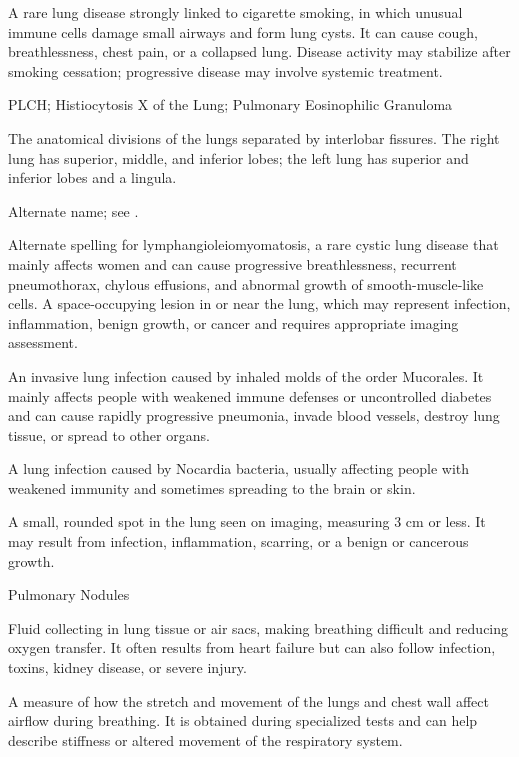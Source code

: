  A rare lung disease strongly linked to cigarette smoking, in which unusual immune cells damage small airways and form lung cysts. It can cause cough, breathlessness, chest pain, or a collapsed lung. Disease activity may stabilize after smoking cessation; progressive disease may involve systemic treatment.

\synonyms
PLCH; Histiocytosis X of the Lung; Pulmonary Eosinophilic Granuloma

 The anatomical divisions of the lungs separated by interlobar fissures. The right lung
has superior, middle, and inferior lobes; the left lung has superior and inferior lobes
and a lingula.

 Alternate name; see .

 Alternate spelling for lymphangioleiomyomatosis, a rare cystic lung disease that mainly affects women and can cause progressive breathlessness, recurrent pneumothorax, chylous effusions, and abnormal growth of smooth-muscle-like cells.
 A space-occupying lesion in or near the lung, which may represent infection, inflammation, benign growth, or cancer and requires appropriate imaging assessment.

 An invasive lung infection caused by inhaled molds of the order Mucorales. It mainly affects people with weakened immune defenses or uncontrolled diabetes and can cause rapidly progressive pneumonia, invade blood vessels, destroy lung tissue, or spread to other organs.

 A lung infection caused by Nocardia bacteria, usually affecting people with weakened immunity and sometimes spreading to the brain or skin.

 A small, rounded spot in the lung seen on imaging, measuring 3 cm or less. It may result from infection, inflammation, scarring, or a benign or cancerous growth.

\synonyms
Pulmonary Nodules

 Fluid collecting in lung tissue or air sacs, making breathing difficult and reducing oxygen transfer. It often results from heart failure but can also follow infection, toxins, kidney disease, or severe injury.

 A measure of how the stretch and movement of the lungs and chest wall affect airflow during breathing. It is obtained during specialized tests and can help describe stiffness or altered movement of the respiratory system.

